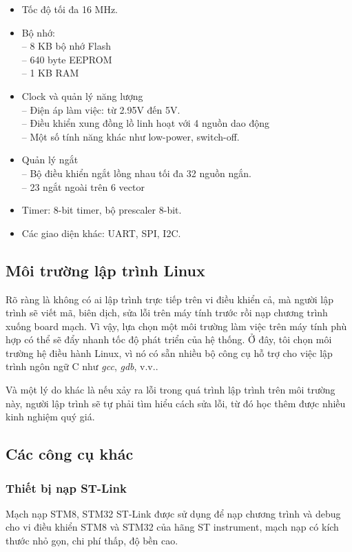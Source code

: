 \begin{itemize}
\item Tốc độ tối đa 16 MHz.
\item Bộ nhớ:\\
    -- 8 KB bộ nhớ Flash\\
    -- 640 byte EEPROM \\
    -- 1 KB RAM
\item Clock và quản lý năng lượng\\
    -- Điện áp làm việc: từ 2.95V đến 5V.\\
    -- Điều khiển xung đồng lồ linh hoạt với 4 nguồn dao động\\
    -- Một số tính năng khác như low-power, switch-off.
\item Quản lý ngắt\\
    -- Bộ điều khiển ngắt lồng nhau tối đa 32 nguồn ngắn.\\
    -- 23 ngắt ngoài trên 6 vector
\item Timer: 8-bit timer, bộ prescaler 8-bit.
\item Các giao diện khác: UART, SPI, I2C.
\end{itemize}

\subsection{Môi trường lập trình Linux}
Rõ ràng là không có ai lập trình trực tiếp trên vi điều khiển cả, mà người lập trình sẽ viết mã, biên dịch, sửa lỗi trên máy tính trước rồi nạp chương trình xuống board mạch.
Vì vậy, lựa chọn một môi trường làm việc trên máy tính phù hợp có thể sẽ đẩy nhanh tốc độ phát triển của hệ thống.
Ở đây, tôi chọn môi trường hệ điều hành Linux, vì nó có sẵn nhiều bộ công cụ hỗ trợ cho việc lập trình ngôn ngữ C như \emph{gcc}, \emph{gdb}, v.v..

Và một lý do khác là nếu xảy ra lỗi trong quá trình lập trình trên môi trường này, người lập trình sẽ tự phải tìm hiểu cách sửa lỗi, từ đó học thêm được nhiều kinh nghiệm quý giá.

\subsection{Các công cụ khác}
\subsubsection{Thiết bị nạp ST-Link}
Mạch nạp STM8, STM32 ST-Link được sử dụng để nạp chương trình và debug cho vi điều khiển STM8 và STM32 của hãng ST instrument, mạch nạp có kích thước nhỏ gọn, chi phí thấp, độ bền cao.

